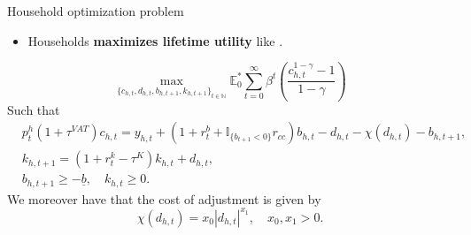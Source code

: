 \documentclass[9pt]{beamer}
\begin{document}
\begin{frame}{Household optimization problem}
\begin{itemize}
    \item Households \textbf{maximizes lifetime utility} like \cite{kaplan_monetary_2018}.
\end{itemize}


\begin{equation}
\max _{\{c_{h,t}, d_{h,t}, b_{h,t+1},k_{h,t+1}\}_{t \in \mathbb{N}}} \mathbb{E}_0^* \sum_{t=0}^{\infty} \beta^t \left(\frac{c_{h,t}^{1-\gamma}-1}{1-\gamma}\right)
\end{equation}
Such that
\begin{equation}
\begin{aligned}
& p^h_t (1+\tau^{VAT})c_{h,t} = y_{h,t} +\left(1+r_t^b+\mathbb{I}_{\{b_{t+1}<0\}}r_{cc}\right) b_{h,t} -d_{h,t}-\chi(d_{h,t})-b_{h,t+1},\\
& k_{h,t+1}= \left(1+r^k_t-\tau^K\right) k_{h,t}+d_{h,t},\\
& b_{h,t+1}\geqslant -\underline{b}, \quad k_{h,t} \geqslant 0 . 
\end{aligned}
\end{equation}
We moreover have that the cost of adjustment is given by
\begin{equation}
    \chi(d_{h,t})=x_0|d_{h,t}|^{x_1}, \quad x_0, x_1>0.
\end{equation}


\end{frame}
\end{document}
